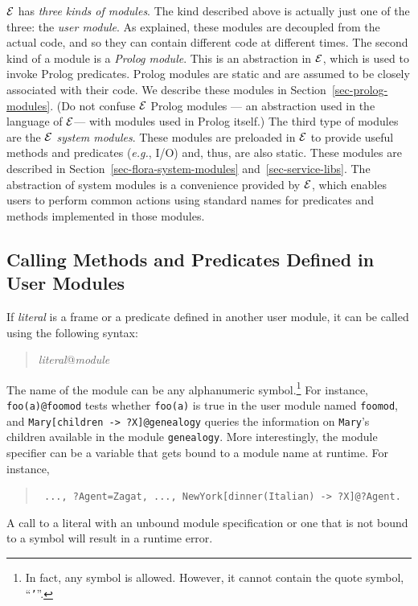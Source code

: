 \documentclass[11pt]{article}
\newcommand{\ERGO}{\mbox{\ensuremath{\cal{E}}\smaller{{\sc{RGO}}}}\xspace}
\newcommand{\FLSYSTEM}{\ERGO}
\newcommand{\mvd}{{\mbox{\tt \,->\,}}}  %
\begin{document}
\FLSYSTEM has \emph{three kinds of modules}.
The kind described above is actually just one of the three:
the \emph{user module}. As explained, these modules are decoupled from the
actual code, and so they can contain different code at different times.
The second kind of a module
is a \emph{Prolog module}. This is an abstraction in \FLSYSTEM,
which is used to invoke Prolog predicates. Prolog modules are static and are
assumed to be closely associated with their code. We describe these modules
in Section~\ref{sec-prolog-modules}. (Do not confuse \FLSYSTEM Prolog modules
--- an abstraction used in the language of \FLSYSTEM --- with modules used
in Prolog itself.)  The third type of modules are the
\emph{\FLSYSTEM system modules}. These modules are preloaded in \FLSYSTEM
to provide useful methods and predicates ({\it e.g.}, I/O) and,
thus, are also static. These modules are described in
Section~\ref{sec-flora-system-modules} and~\ref{sec-service-libs}. The
abstraction of system modules is a convenience provided by \FLSYSTEM, which
enables users to perform common actions using standard names for
predicates and methods implemented in those modules.


\subsection{Calling Methods and Predicates Defined in User Modules}
\label{sec-user-mods}


%
If \emph{literal} is a frame or a predicate defined in another
user module, it can be called using the following syntax:
\begin{quote}
\emph{literal}@\emph{module} 
\end{quote}
The name of the module can be any alphanumeric symbol.\footnote{
  In fact, any symbol is allowed. However, it cannot contain the quote
  symbol, ``{\tt '}''.
  }
For instance, \verb|foo(a)@foomod| tests whether {\tt foo(a)} is true in
the user module named {\tt foomod}, and {\tt Mary[children\mvd ?X]@genealogy}
queries the information on {\tt Mary}'s children available in the module
{\tt genealogy}. More interestingly, the module specifier can be a variable
that gets bound to a module name at runtime. For instance, 
\begin{quote}
 {\tt
   ..., ?Agent=Zagat, ..., NewYork[dinner(Italian)\mvd ?X]@?Agent.
   }
\end{quote}
A call to a literal with an unbound module specification or one that is not
bound to a symbol will result in a runtime error.
\end{document}
